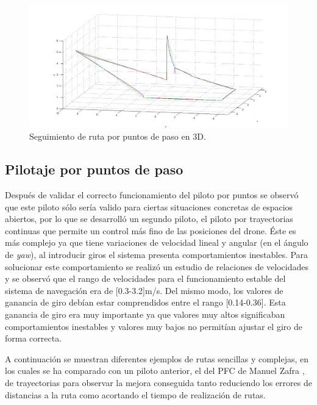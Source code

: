 \begin{figure}[H]
	\begin{center}
		\includegraphics[width=1.0\textwidth]{imag/IMG47.png}
				\caption{Seguimiento de ruta por puntos de paso en 3D.}
		\label{fig:Error asociado al pilotaje.}	
	\end{center}
\end{figure}

\subsection{Pilotaje por puntos de paso}
\hspace{1cm} Después de validar el correcto funcionamiento del piloto por puntos se observó que este piloto sólo sería valido para ciertas situaciones concretas de espacios abiertos, por lo que se desarrolló un segundo piloto, el piloto por trayectorias continuas que permite un control más fino de las posiciones del drone. Éste es más complejo ya que tiene variaciones de velocidad lineal y angular (en el ángulo de \textit{yaw}), al introducir giros el sistema presenta comportamientos inestables. Para solucionar este comportamiento se realizó un estudio de relaciones de velocidades y se observó que el rango de velocidades para el funcionamiento estable del sistema de navegación era de [0.3-3.2]m/s. Del mismo modo, los valores de ganancia de giro debían estar comprendidos entre el rango [0.14-0.36]. Esta ganancia de giro era muy importante ya que valores muy altos significaban comportamientos inestables y valores muy bajos no permitían ajustar el giro de forma correcta. 

\hspace{1cm} A continuación se muestran diferentes ejemplos de rutas sencillas y complejas, en los cuales se ha comparado con un piloto anterior, el del PFC de Manuel Zafra \cite{ManuelZafra}, de trayectorias para observar la mejora conseguida tanto reduciendo los errores de distancias a la ruta como acortando el tiempo de realización de rutas.

